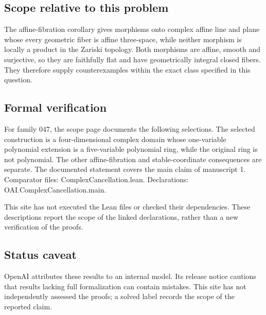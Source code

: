 \documentclass[11pt]{article}
\begin{document}
\subsection{Scope relative to this problem}
The affine-fibration corollary gives morphisms onto complex affine line and plane whose every geometric fiber is affine three-space, while neither morphism is locally a product in the Zariski topology. Both morphisms are affine, smooth and surjective, so they are faithfully flat and have geometrically integral closed fibers. They therefore supply counterexamples within the exact class specified in this question.

\subsection{Formal verification}
For family 047, the scope page documents the following selections. The selected construction is a four-dimensional complex domain whose one-variable polynomial extension is a five-variable polynomial ring, while the original ring is not polynomial. The other affine-fibration and stable-coordinate consequences are separate. The documented statement covers the main claim of manuscript 1. Comparator files: ComplexCancellation.lean. Declarations: OAI.ComplexCancellation.main.

This site has not executed the Lean files or checked their dependencies. These descriptions report the scope of the linked declarations, rather than a new verification of the proofs.

\subsection{Status caveat}
OpenAI attributes these results to an internal model. Its release notice cautions that results lacking full formalization can contain mistakes. This site has not independently assessed the proofs; a solved label records the scope of the reported claim.
\end{document}

